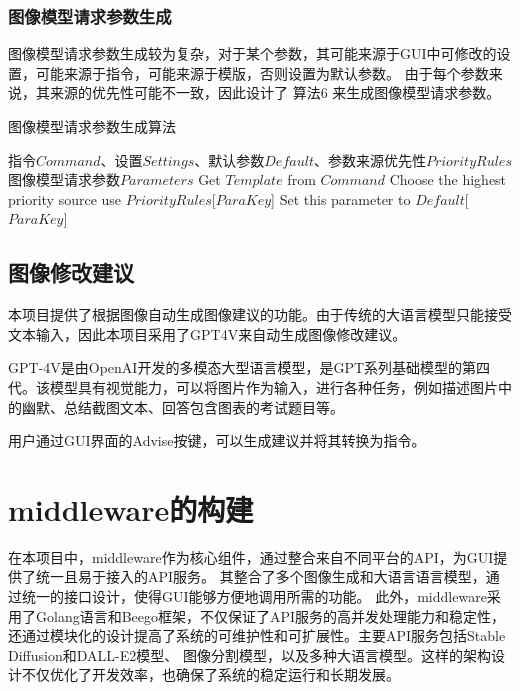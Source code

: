 \documentclass[a4paper,AutoFakeBold,oneside,12pt]{book}
\begin{document}
\subsubsection{图像模型请求参数生成}
图像模型请求参数生成较为复杂，对于某个参数，其可能来源于GUI中可修改的设置，可能来源于指令，可能来源于模版，否则设置为默认参数。
由于每个参数来说，其来源的优先性可能不一致，因此设计了 算法6 来生成图像模型请求参数。
\begin{algorithm} 
	\begin{spacing}{1.3}
		\caption{图像模型请求参数生成算法} 
		\label{ImageParasGenAlgorithm}
		\renewcommand{\algorithmicrequire}{\textbf{输入：}}
		\renewcommand{\algorithmicensure}{\textbf{输出：}} 
			\begin{algorithmic}[1] 
				\Require 指令$Command$、设置$Settings$、默认参数$Default$、参数来源优先性$PriorityRules$
				\Ensure 图像模型请求参数$Parameters$
                    \State Get $Template$ from $Command$
                        \State Choose the highest priority source use $PriorityRules$[$ParaKey$]
                    \Else
                        \State Set this parameter to $Default$[$ParaKey$]
                    \EndIf
                \EndFor
			\end{algorithmic}
	\end{spacing}
\end{algorithm}

\subsection{图像修改建议}
本项目提供了根据图像自动生成图像建议的功能。由于传统的大语言模型只能接受文本输入，因此本项目采用了GPT4V来自动生成图像修改建议。

GPT-4V是由OpenAI开发的多模态大型语言模型，是GPT系列基础模型的第四代。该模型具有视觉能力，可以将图片作为输入，进行各种任务，例如描述图片中的幽默、总结截图文本、回答包含图表的考试题目等。

用户通过GUI界面的Advise按键，可以生成建议并将其转换为指令。

\section{middleware的构建} %
在本项目中，middleware作为核心组件，通过整合来自不同平台的API，为GUI提供了统一且易于接入的API服务。
其整合了多个图像生成和大语言语言模型，通过统一的接口设计，使得GUI能够方便地调用所需的功能。
此外，middleware采用了Golang语言和Beego框架，不仅保证了API服务的高并发处理能力和稳定性，
还通过模块化的设计提高了系统的可维护性和可扩展性。主要API服务包括Stable Diffusion和DALL-E2模型、
图像分割模型，以及多种大语言模型。这样的架构设计不仅优化了开发效率，也确保了系统的稳定运行和长期发展。
\end{document}
